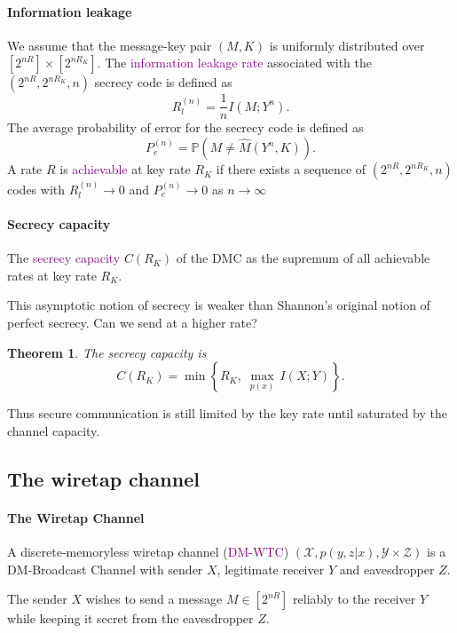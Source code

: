 \documentclass[a4paper, 11pt, openany]{book}
\numberwithin{equation}{section}
\theoremstyle{plain}
\newtheorem{theorem}	[equation]	{Theorem}
\theoremstyle{definition}
\newcommand{\probability}{\mathbb{P}}
\newcommand{\Define}[1]{\textcolor{purple}{#1}}
\newcommand{\alphabet}[1]{\mathcal{#1}}
\begin{document}
\paragraph{Information leakage}

We assume that the message-key pair $(M,K)$ is uniformly distributed over
$[2^{nR}] \times [2^{nR_K}]$. The \Define{information leakage rate} associated with the $(2^{nR}, 2^{nR_K}, n)$ secrecy code is defined as
\[
	R_l^{(n)} = \frac{1}{n} I(M; Y^n).
\]
The average probability of error for the secrecy code is defined as
\[
	P_e^{(n)} = \probability( M \ne \hat{M}(Y^n, K) ).
\]
A rate $R$ is \Define{achievable} at key rate $R_K$ if there exists a sequence of
$(2^{nR}, 2^{nR_K}, n)$ codes with $R_l^{(n)} \to 0$ and $P_e^{(n)} \to 0$ as $n \to \infty$


\paragraph{Secrecy capacity}
The \Define{secrecy capacity} $C(R_K)$ of the DMC as the supremum of all achievable
rates at key rate $R_K$.

This asymptotic notion of secrecy is weaker than Shannon's original notion of
perfect secrecy. Can we send at a higher rate?

\begin{theorem} 
The secrecy capacity is
\[
	C(R_K) = \min \left\{ R_K, \; \max_{p(x)}\, I(X;Y) \right\}.
\]
\end{theorem}
Thus secure communication is still limited by the key rate until saturated by the
channel capacity.



\subsection{The wiretap channel}



\paragraph{The Wiretap Channel}
A discrete-memoryless wiretap channel (\Define{DM-WTC}) $(\alphabet{X}, p(y, z|x), \alphabet{Y} \times \alphabet{Z})$ is a DM-Broadcast Channel with sender $X$, legitimate receiver $Y$ and eavesdropper $Z$.

The sender $X$ wishes to send a message $M \in [2^{nR}]$ reliably to the receiver
$Y$ while keeping it secret from the eavesdropper $Z$.
\end{document}
